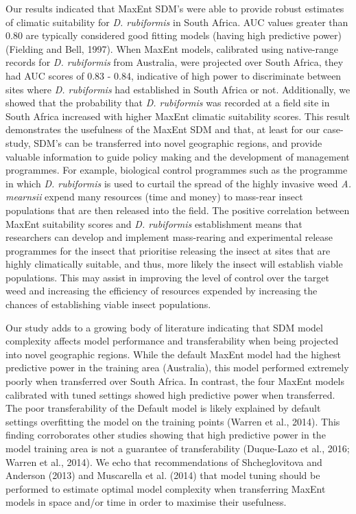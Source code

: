 \documentclass[12pt,]{article}
\begin{document}
Our results indicated that MaxEnt SDM's were able to provide robust
estimates of climatic suitability for \emph{D. rubiformis} in South
Africa. AUC values greater than 0.80 are typically considered good
fitting models (having high predictive power) (Fielding and Bell, 1997).
When MaxEnt models, calibrated using native-range records for \emph{D.
rubiformis} from Australia, were projected over South Africa, they had
AUC scores of 0.83 - 0.84, indicative of high power to discriminate
between sites where \emph{D. rubiformis} had established in South Africa
or not. Additionally, we showed that the probability that \emph{D.
rubiformis} was recorded at a field site in South Africa increased with
higher MaxEnt climatic suitability scores. This result demonstrates the
usefulness of the MaxEnt SDM and that, at least for our case-study,
SDM's can be transferred into novel geographic regions, and provide
valuable information to guide policy making and the development of
management programmes. For example, biological control programmes such
as the programme in which \emph{D. rubiformis} is used to curtail the
spread of the highly invasive weed \emph{A. mearnsii} expend many
resources (time and money) to mass-rear insect populations that are then
released into the field. The positive correlation between MaxEnt
suitability scores and \emph{D. rubiformis} establishment means that
researchers can develop and implement mass-rearing and experimental
release programmes for the insect that prioritise releasing the insect
at sites that are highly climatically suitable, and thus, more likely
the insect will establish viable populations. This may assist in
improving the level of control over the target weed and increasing the
efficiency of resources expended by increasing the chances of
establishing viable insect populations.

Our study adds to a growing body of literature indicating that SDM model
complexity affects model performance and transferability when being
projected into novel geographic regions. While the default MaxEnt model
had the highest predictive power in the training area (Australia), this
model performed extremely poorly when transferred over South Africa. In
contrast, the four MaxEnt models calibrated with tuned settings showed
high predictive power when transferred. The poor transferability of the
Default model is likely explained by default settings overfitting the
model on the training points (Warren et al., 2014). This finding
corroborates other studies showing that high predictive power in the
model training area is not a guarantee of transferability (Duque-Lazo et
al., 2016; Warren et al., 2014). We echo that recommendations of
Shcheglovitova and Anderson (2013) and Muscarella et al. (2014) that
model tuning should be performed to estimate optimal model complexity
when transferring MaxEnt models in space and/or time in order to
maximise their usefulness.
\end{document}
